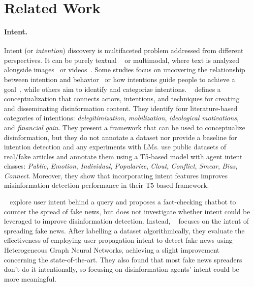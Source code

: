 \documentclass[11pt]{article}
\newcommand{\infotext}[1]{\textcolor{red!70!black}{\textbf{#1}}}
\begin{document}
\section{Related Work}

\paragraph{Intent.}
Intent (or \textit{intention}) discovery is multifaceted problem addressed from different perspectives. It can be purely textual ~\citep{Xu2023} or multimodal, where text is analyzed alongside images~\citep{kruk-etal-2019-integrating} or videos~\citep{maharana-etal-2022-multimodal}. 
Some studies focus on uncovering the relationship between intention and behavior~\citep{Conner2022-CONUTI-2} or how intentions guide people to achieve a goal~\citep{suchodoletz2011}, while others aim to identify and categorize intentions.
~\citet{10.1093/ct/qtac021} defines a conceptualization that connects actors, intentions, and techniques for creating and disseminating disinformation content. They 
identify four literature-based categories of intentions: \textit{delegitimization}, \textit{mobilization}, \textit{ideological motivations}, and \textit{financial gain}. They present a framework that can be used to conceptualize disinformation, but they do not annotate a dataset nor provide a baseline for intention detection and any experiments with LMs. \citet{10.1145/3627673.3679799} use public datasets of real/fake articles and annotate them using a T5-based model with agent intent classes: \textit{Public}, \textit{Emotion}, \textit{Individual}, \textit{Popularize}, \textit{Clout}, \textit{Conflict}, \textit{Smear}, \textit{Bias}, \textit{Connect}. 
Moreover, they show that incorporating intent features improves misinformation detection performance in their T5-based framework. 

~\citet{gupta2021truthbotautomatedconversationaltool} explore user intent behind a query and proposes a fact-checking chatbot to counter the spread of fake news, but does not investigate whether intent could be leveraged to improve disinformation detection.
Instead, ~\citet{Zhou_2022} focuses on the intent of spreading fake news. After labelling a dataset algorithmically, they evaluate the effectiveness of employing user propagation intent to detect fake news using Heterogeneous Graph Neural Networks, achieving a slight improvement concerning the state-of-the-art. They also found that most fake news spreaders don't do it intentionally, so focusing on disinformation agents' intent could be more meaningful.
 
\end{document}

